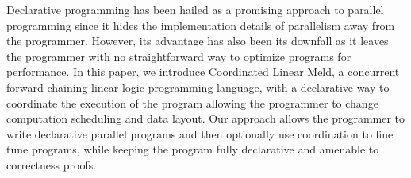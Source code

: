 Declarative programming has been hailed as a promising approach to parallel
programming since it hides the implementation details of parallelism away from the
programmer. However, its advantage has also been its downfall
as it leaves the programmer with no straightforward way
to optimize programs for performance.
In this paper, we introduce Coordinated Linear Meld, a concurrent forward-chaining linear logic programming
language, with a declarative way to coordinate the execution of the program
allowing the programmer to change
computation scheduling and data layout. Our approach allows the programmer to
write declarative parallel programs and then optionally use coordination 
to fine tune programs, while keeping the program fully declarative and amenable
to correctness proofs.
